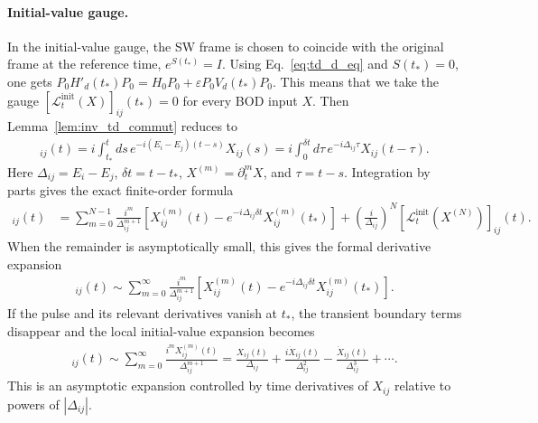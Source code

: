 \paragraph{{Initial-value gauge.}}
In the initial-value gauge, the SW frame is chosen to coincide with the original frame at the reference time, $e^{S(t_\ast)}=I$.
Using Eq.~\eqref{eq:td_d_eq} and $S(t_\ast)=0$, one gets
$P_0H'_d(t_\ast)P_0=H_0P_0+\varepsilon P_0V_d(t_\ast)P_0$.
This means that we take the gauge $[\mathcal L_t^{\mathrm{init}}(X)]_{ij}(t_\ast)=0$ for every BOD input $X$.
Then Lemma~\ref{lem:inv_td_commut} reduces to
\begin{align}
    [\mathcal L^{\mathrm{init}}_t(X)]_{ij}(t)
    =i\int_{t_\ast}^{t}ds\,
    e^{-i(E_i-E_j)(t-s)}X_{ij}(s) = i\int_0^{\delta t}d\tau\,
    e^{-i\Delta_{ij}\tau}X_{ij}(t-\tau).
\end{align}
Here $\Delta_{ij}=E_i-E_j$, $\delta t=t-t_\ast$, $X^{(m)}=\partial_t^m X$, and $\tau=t-s$.
Integration by parts gives the exact finite-order formula
\begin{align}
    [\mathcal L^{\mathrm{init}}_t(X)]_{ij}(t)
    &=
    \sum_{m=0}^{N-1}
    \frac{i^m}{\Delta_{ij}^{m+1}}
    \left[
    X_{ij}^{(m)}(t)
    -e^{-i\Delta_{ij}\delta t}X_{ij}^{(m)}(t_\ast)
    \right]
    +\left(\frac{i}{\Delta_{ij}}\right)^N
    [\mathcal L^{\mathrm{init}}_t(X^{(N)})]_{ij}(t).
\end{align}
When the remainder is asymptotically small, this gives the formal derivative expansion
\begin{align}
    [\mathcal L^{\mathrm{init}}_t(X)]_{ij}(t)
    \sim
    \sum_{m=0}^{\infty}
    \frac{i^m}{\Delta_{ij}^{m+1}}
    \left[
    X_{ij}^{(m)}(t)
    -e^{-i\Delta_{ij}\delta t}X_{ij}^{(m)}(t_\ast)
    \right].
\end{align}
If the pulse and its relevant derivatives vanish at $t_\ast$, the transient boundary terms disappear and the local initial-value expansion becomes
\begin{align}
    [\mathcal L^{\mathrm{init}}_t(X)]_{ij}(t)
    \sim
    \sum_{m=0}^{\infty}
    \frac{i^m X_{ij}^{(m)}(t)}{\Delta_{ij}^{m+1}}
    =
    \frac{X_{ij}(t)}{\Delta_{ij}}
    +\frac{i\dot X_{ij}(t)}{\Delta_{ij}^2}
    -\frac{\ddot X_{ij}(t)}{\Delta_{ij}^3}
    +\cdots .
\end{align}
This is an asymptotic expansion controlled by time derivatives of $X_{ij}$ relative to powers of $|\Delta_{ij}|$.

